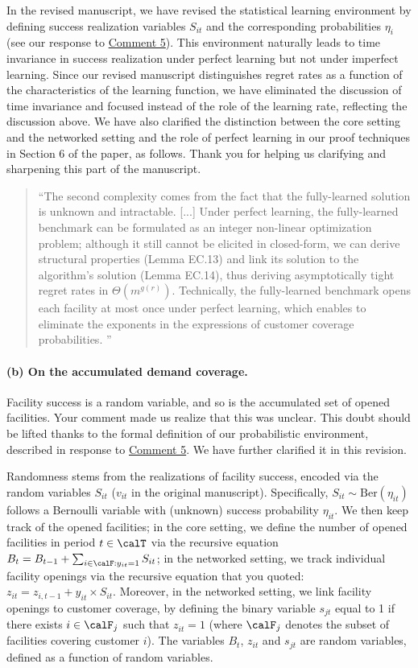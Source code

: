 \documentclass[11pt]{article}
\begin{document}
In the revised manuscript, we have revised the statistical learning environment by defining success realization variables $S_{it}$ and the corresponding probabilities $\eta_i$ (see our response to \hyperref[AE:5]{\color{blue}Comment 5}). This environment naturally leads to time invariance in success realization under perfect learning but not under imperfect learning. Since our revised manuscript distinguishes regret rates as a function of the characteristics of the learning function, we have eliminated the discussion of time invariance and focused instead of the role of the learning rate, reflecting the discussion above. We have also clarified the distinction between the core setting and the networked setting and the role of perfect learning in our proof techniques in Section 6 of the paper, as follows. Thank you for helping us clarifying and sharpening this part of the manuscript.
\begin{quote}
    ``The second complexity comes from the fact that the fully-learned solution is unknown and intractable. [...] Under perfect learning, the fully-learned benchmark can be formulated as an integer non-linear optimization problem; although it still cannot be elicited in closed-form, we can derive structural properties (Lemma EC.13) and link its solution to the algorithm's solution (Lemma EC.14), thus deriving asymptotically tight regret rates in $\Theta(m^{g(r)})$. Technically, the fully-learned benchmark opens each facility at most once under perfect learning, which enables to eliminate the exponents in the expressions of customer coverage probabilities. ''
\end{quote}

\paragraph{(b) On the accumulated demand coverage.}

Facility success is a random variable, and so is the accumulated set of opened facilities. Your comment made us realize that this was unclear. This doubt should be lifted thanks to the formal definition of our probabilistic environment, described in response to \hyperref[AE:5]{\color{blue}Comment 5}. We have further clarified it in this revision.

Randomness stems from the realizations of facility success, encoded via the random variables $S_{it}$ ($v_{it}$ in the original manuscript). Specifically, $S_{it}\sim \text{Ber}(\eta_{it})$ follows a Bernoulli variable with (unknown) success probability $\eta_{it}$. We then keep track of the opened facilities; in the core setting, we define the number of opened facilities in period $t\in\calT$ via the recursive equation $B_t=B_{t-1}+\sum_{i\in\calF:y_{it}=1}S_{it}$; in the networked setting, we track individual facility openings via the recursive equation that you quoted: $z_{it}=z_{i,t-1} + y_{it} \times S_{it}$. Moreover, in the networked setting, we link facility openings to customer coverage, by defining the binary variable $s_{jt}$ equal to 1 if there exists $i\in\calF_j$ such that $z_{it}=1$ (where $\calF_j$ denotes the subset of facilities covering customer $i$). The variables $B_t$, $z_{it}$ and $s_{jt}$ are random variables, defined as a function of random variables.
\end{document}
